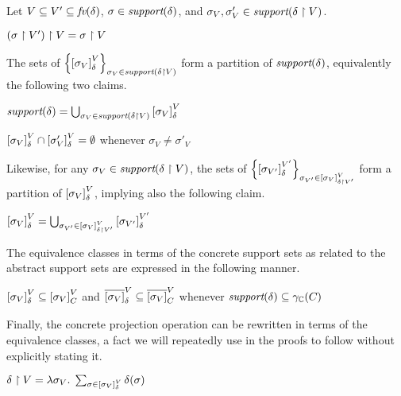 \begin{remark} \label{thm:pp:project:eqclass} Let $ V \subseteq V' \subseteq \textit{fv}(\delta) $, 
$ \sigma \in \textit{support}(\delta) $, and
$ \sigma_V, \sigma'_V \in \textit{support}(\delta \upharpoonright V) $.

\begin{subtheorem} \label{thm:pp:project:eqclass:project}
$ \left( \sigma \upharpoonright V' \right) \upharpoonright V = \sigma \upharpoonright V $
\end{subtheorem}

The sets of $ \left\{ \left[ \sigma_V \right]_{\delta}^{V} \right\}_{\sigma_V \in \textit{support}(\delta \upharpoonright V)} $ form a partition of
$ \textit{support}(\delta) $, equivalently the following two claims.

\begin{subtheorem} \label{thm:pp:project:eqclass:cover}
$ \textit{support}(\delta)
= \bigcup_{\sigma_V \in \textit{support}(\delta \upharpoonright V)} \left[ \sigma_V \right]_{\delta}^{V}
$
\end{subtheorem}

\begin{subtheorem} \label{thm:pp:project:eqclass:disjoint}
$ \left[ \sigma_V \right]_{\delta}^{V} \cap \left[ \sigma'_V \right]_{\delta}^{V}
= \emptyset $ whenever $ \sigma_V \neq \sigma'_V $
\end{subtheorem}

Likewise, for any $ \sigma_{V} \in \textit{support}(\delta \upharpoonright V) $,
the sets of
$ \left\{ \left[ \sigma_{V'} \right]_{\delta}^{V'} \right\}_{\sigma_{V'} \in \left[ \sigma_V \right]_{\delta \upharpoonright V'}^{V}}
$ form a partition of $ \left[ \sigma_{V} \right]_{\delta}^{V} $, implying
also the following claim.

\begin{subtheorem} \label{thm:pp:project:eqclass:order}
$ \left[ \sigma_V \right]_{\delta}^{V}
= \bigcup_{\sigma_{V'} \in \left[ \sigma_V \right]_{\delta \upharpoonright V'}^{V}} \left[ \sigma_{V'} \right]_{\delta}^{V'}
$ 
\end{subtheorem}

The equivalence classes in terms of the concrete support sets as
related to the abstract support sets are expressed in the following
manner.

\begin{subtheorem} \label{thm:pp:project:eqclass:subsets}
$ \left[ \sigma_V \right]_{\delta}^{V} \subseteq \left[ \sigma_V \right]_{C_{}}^{V}
$ and 
$ \overline{\left[ \sigma_V \right]}_{\delta}^{V} \subseteq \overline{\left[ \sigma_V \right]}_{C_{}}^{V}
$ whenever $ \textit{support}(\delta) \subseteq \gamma_{\mathbb{C}}(C_{}) $
\end{subtheorem}

Finally, the concrete projection operation can be rewritten in terms
of the equivalence classes, a fact we will repeatedly use in the
proofs to follow without explicitly stating it.

\begin{subtheorem} \label{thm:pp:project:eqclass:projection}
$ \delta \upharpoonright V = \lambda \sigma_V . \; \sum_{\sigma \in \left[ \sigma_V \right]_{\delta}^{V}} \delta
(\sigma) $
\end{subtheorem}

\end{remark}


